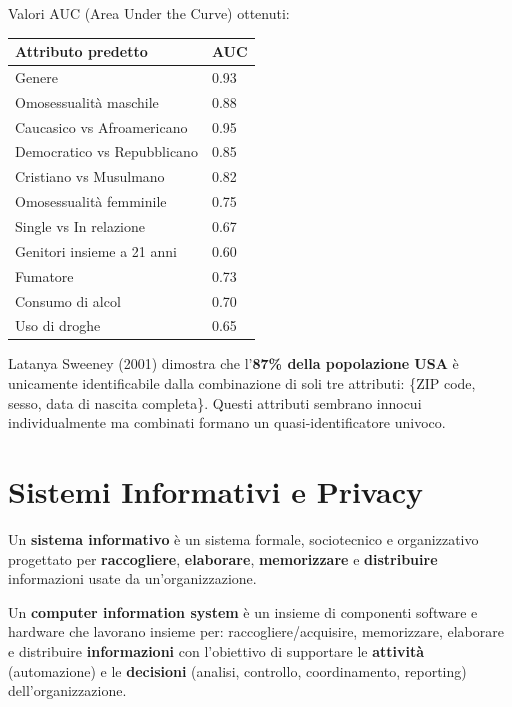 \documentclass[a4paper,11pt]{article}
\begin{document}
\begin{esempio}
Valori AUC (Area Under the Curve) ottenuti:
\begin{center}
\begin{tabular}{ll}
\toprule
\textbf{Attributo predetto} & \textbf{AUC} \\
\midrule
Genere & 0.93 \\
Omosessualit\`{a} maschile & 0.88 \\
Caucasico vs Afroamericano & 0.95 \\
Democratico vs Repubblicano & 0.85 \\
Cristiano vs Musulmano & 0.82 \\
Omosessualit\`{a} femminile & 0.75 \\
Single vs In relazione & 0.67 \\
Genitori insieme a 21 anni & 0.60 \\
Fumatore & 0.73 \\
Consumo di alcol & 0.70 \\
Uso di droghe & 0.65 \\
\bottomrule
\end{tabular}
\end{center}
\end{esempio}

\begin{esempio}
Latanya Sweeney (2001) dimostra che l'\textbf{87\% della popolazione USA} \`{e} unicamente identificabile dalla combinazione di soli tre attributi: \{ZIP code, sesso, data di nascita completa\}. Questi attributi sembrano innocui individualmente ma combinati formano un quasi-identificatore univoco.
\end{esempio}

\section{Sistemi Informativi e Privacy}

\begin{definizione}
Un \textbf{sistema informativo} \`{e} un sistema formale, sociotecnico e organizzativo progettato per \textbf{raccogliere}, \textbf{elaborare}, \textbf{memorizzare} e \textbf{distribuire} informazioni usate da un'organizzazione.

Un \textbf{computer information system} \`{e} un insieme di componenti software e hardware che lavorano insieme per: raccogliere/acquisire, memorizzare, elaborare e distribuire \textbf{informazioni} con l'obiettivo di supportare le \textbf{attivit\`{a}} (automazione) e le \textbf{decisioni} (analisi, controllo, coordinamento, reporting) dell'organizzazione.
\end{definizione}
\end{document}
